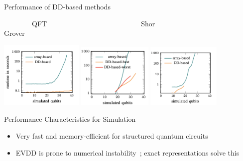 \begin{refframe}{Performance of DD-based methods}
\centering

	~~~~~~~~QFT~~~~~~~~~~~~~~~~~~~~~~~~~~~Shor~~~~~~~~~~~~~~~~~~~~~~~~~~~~Grover\vspace{-1em}

	\includegraphics[height=3.2cm]{graphics/perf-qft}\hspace{-1em}
	\includegraphics[height=3.1cm]{graphics/perf-shor}\hspace{-1ex}	
	\includegraphics[height=3.1cm]{graphics/perf-grover}

\begin{alertblock}{Performance Characteristics for Simulation~\cite{grurl2020arrays}}
	\begin{itemize}
		\item Very fast and memory-efficient for structured quantum circuits
		\item EVDD is prone to numerical instability~\cite{niemann2020overcoming}; exact representations solve this~\cite{9586191} 
	\end{itemize}
\end{alertblock}

\vspace{-1em}

\end{refframe}













